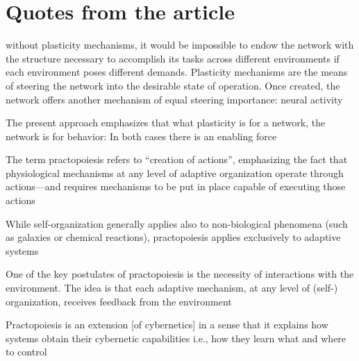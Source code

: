 \documentclass[10pt,a4paper]{article}
\begin{document}
\section{Quotes from the article}
without plasticity mechanisms,
it would be impossible to endow the network with the structure
necessary to accomplish its tasks across different environments if each
environment poses different demands. Plasticity mechanisms are the
means of steering the network into the desirable state of operation. Once created, the network offers another mechanism of equal steering
importance: neural activity


The present approach emphasizes that what plasticity is for a
network, the network is for behavior: In both cases there is an enabling
force


The term practopoiesis refers
to “creation of actions”, emphasizing the fact that physiological
mechanisms at any level of adaptive organization operate through
actions—and requires mechanisms to be put in place capable of
executing those actions

While self-organization generally applies also
to non-biological phenomena (such as galaxies or chemical reactions),
practopoiesis applies exclusively to adaptive systems


One of the key postulates of practopoiesis is the necessity of
interactions with the environment. The idea is that each adaptive
mechanism, at any level of (self-) organization, receives feedback
from the environment


Practopoiesis is an extension [of cybernetics] in a sense that it explains how systems
obtain their cybernetic capabilities i.e., how they learn what and
where to control
\end{document}
